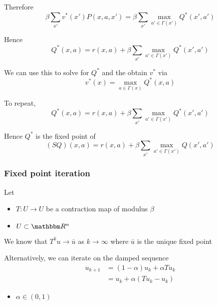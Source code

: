 \documentclass[xcolor=dvipsnames]{beamer}  %
\newcommand{\1}{\mathbbm 1}
\newcommand{\RR}{\mathbbm R}
\begin{document}
\begin{frame}
    
    Therefore
    \begin{equation*}
        \beta \sum_{x'} v^*(x') P(x,a,x') 
        = \beta \sum_{x'} \max_{a' \in \Gamma(x')} Q^*(x',a')
    \end{equation*}

    Hence
    \begin{equation*}
        Q^*(x,a) = r(x, a) + \beta \sum_{x'} \max_{a' \in \Gamma(x')} Q^*(x',a')
    \end{equation*}

    We can use this to solve for $Q^*$ and the obtain $v^*$ via
    \begin{equation*}
        v^*(x)  = \max_{a \in \Gamma(x)} Q^*(x,a)
    \end{equation*}
    

\end{frame}

\begin{frame}

    To repeat,
    \begin{equation*}
        Q^*(x,a) = r(x, a) + \beta \sum_{x'} \max_{a' \in \Gamma(x')} Q^*(x',a')
    \end{equation*}

    Hence $Q^*$ is the fixed point of
    \begin{equation*}
        (S Q)(x,a)
        =  r(x, a) + \beta \sum_{x'} \max_{a' \in \Gamma(x')} Q(x',a')
    \end{equation*}
    

\end{frame}

\begin{frame}
    \frametitle{Fixed point iteration}

    Let 
    \begin{itemize}
        \item $T \colon U \to U$ be a contraction map of modulus $\beta$
        \item $U \subset \RR^n$
    \end{itemize}

    We know that $T^k u \to \bar u$ as $k \to \infty$ where $\bar u$ is the
    unique fixed point

    Alternatively, we can iterate on the damped sequence
    \begin{align*}
        u_{k+1} 
        & = (1-\alpha) u_k + \alpha T u_k
        \\
        & =  u_k + \alpha (T u_k - u_k)
    \end{align*}

    \begin{itemize}
        \item $\alpha \in (0,1)$
    \end{itemize}

\end{frame}
\end{document}
